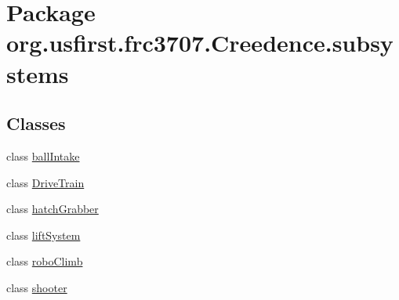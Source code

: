 \hypertarget{namespaceorg_1_1usfirst_1_1frc3707_1_1_creedence_1_1subsystems}{}\section{Package org.\+usfirst.\+frc3707.\+Creedence.\+subsystems}
\label{namespaceorg_1_1usfirst_1_1frc3707_1_1_creedence_1_1subsystems}
\subsection*{Classes}
\begin{DoxyCompactItemize}
\item 
class \mbox{\hyperlink{classorg_1_1usfirst_1_1frc3707_1_1_creedence_1_1subsystems_1_1ball_intake}{ball\+Intake}}
\item 
class \mbox{\hyperlink{classorg_1_1usfirst_1_1frc3707_1_1_creedence_1_1subsystems_1_1_drive_train}{Drive\+Train}}
\item 
class \mbox{\hyperlink{classorg_1_1usfirst_1_1frc3707_1_1_creedence_1_1subsystems_1_1hatch_grabber}{hatch\+Grabber}}
\item 
class \mbox{\hyperlink{classorg_1_1usfirst_1_1frc3707_1_1_creedence_1_1subsystems_1_1lift_system}{lift\+System}}
\item 
class \mbox{\hyperlink{classorg_1_1usfirst_1_1frc3707_1_1_creedence_1_1subsystems_1_1robo_climb}{robo\+Climb}}
\item 
class \mbox{\hyperlink{classorg_1_1usfirst_1_1frc3707_1_1_creedence_1_1subsystems_1_1shooter}{shooter}}
\end{DoxyCompactItemize}
